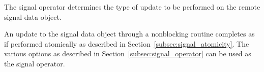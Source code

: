 \begin{apidefinition}
{    The  signal operator determines the type of update to be
    performed on the remote  signal data object.

    An update to the  signal data object through a nonblocking
     routine completes as if performed atomically as described in
    Section~\ref{subsec:signal_atomicity}. The various options as described in
    Section~\ref{subsec:signal_operator} can be used as the  signal
    operator.
}



\end{apidefinition}
